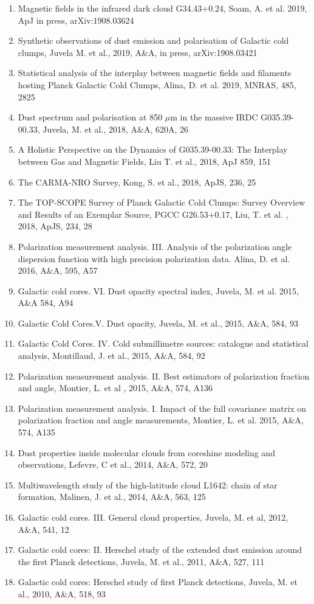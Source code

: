 \documentclass[11pt]{amsart}
\begin{document}
\begin{enumerate}
\item Magnetic fields in the infrared dark cloud G34.43+0.24,
Soam, A. et al. 2019, ApJ in press, arXiv:1908.03624
\item Synthetic observations of dust emission and polarisation of Galactic cold clumps, 
Juvela M. et al.,  2019, A\&A, in press, arXiv:1908.03421
\item Statistical analysis of the interplay between magnetic fields and filaments hosting Planck Galactic Cold Clumps, 
Alina, D. et al.  2019,  MNRAS, 485, 2825
\item Dust spectrum and polarisation at 850 $\mu$m in the massive IRDC G035.39-00.33,
Juvela, M. et al.,  2018, A\&A,  620A, 26
\item A Holistic Perspective on the Dynamics of G035.39-00.33: 
The Interplay between Gas and Magnetic 
Fields,
Liu T. et al., 2018, ApJ 859, 151 
\item The CARMA-NRO Survey,
Kong, S. et al., 2018, ApJS, 236, 25
\item The TOP-SCOPE Survey of Planck Galactic Cold Clumps: Survey Overview and Results of an Exemplar Source, PGCC G26.53+0.17,
Liu, T.  et al. , 2018, ApJS, 234, 28
\item Polarization measurement analysis. III. Analysis of the polarization angle dispersion function with high precision polarization data.
Alina, D. et al. 2016, A\&A, 595, A57 
\item Galactic cold cores. VI. Dust opacity spectral index,
Juvela, M.  et al.  2015, A\&A 584, A94
\item Galactic Cold Cores.V. Dust opacity, 
Juvela, M. et al., 2015, A\&A, 584, 93 
\item Galactic Cold Cores. IV. Cold submillimetre sources: catalogue and statistical analysis, 
Montillaud, J. et al., 2015, A\&A, 584, 92 
\item Polarization measurement analysis. II. Best estimators of polarization fraction and angle,
Montier, L. et al , 2015, A\&A, 574, A136 
\item Polarization measurement analysis. I. Impact of the full covariance matrix on polarization fraction and angle measurements, 
Montier, L. et al. 2015,  A\&A, 574, A135 
\item Dust properties inside molecular clouds from coreshine modeling and observations, 
Lefevre, C et al., 2014, A\&A, 572, 20 
\item Multiwavelength study of the high-latitude cloud L1642: chain of star formation, 
Malinen, J. et al., 2014, A\&A, 563, 125 
\item Galactic cold cores. III. General cloud properties,
Juvela, M. et al, 2012, A\&A, 541, 12 
\item Galactic cold cores: II. Herschel study of the extended dust emission around the first Planck detections, 
Juvela, M. et al., 2011, A\&A, 527, 111 
\item Galactic cold cores: Herschel study of first Planck detections, 
Juvela, M. et al., 2010, A\&A, 518, 93  
\end{enumerate}
\end{document}
